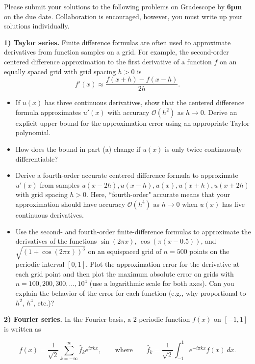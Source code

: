 \documentclass[12pt]{article}
\begin{document}
\noindent
Please submit your solutions to the following problems on Gradescope by \textbf{6pm} on the due date. Collaboration is encouraged, however, you must write up your solutions individually.

\bigskip

\noindent
\textbf{1) Taylor series.} Finite difference formulas are often used to approximate derivatives from function samples on a grid. For example, the second-order centered difference approximation to the first derivative of a function $f$ on an equally spaced grid with grid spacing $h>0$ is
$$
f'(x) \approx \frac{f(x+h)-f(x-h)}{2h}.
$$
\begin{itemize}
    \item[\textbf{(a)}] If $u(x)$ has three continuous derivatives, show that the centered difference formula approximates $u'(x)$ with accuracy $\mathcal{O}(h^2)$ as $h\rightarrow 0$. Derive an explicit upper bound for the approximation error using an appropriate Taylor polynomial. 

	\item[\textbf{(b)}] How does the bound in part (a) change if $u(x)$ is only twice continuously differentiable?
    
    \item[\textbf{(c)}] Derive a fourth-order accurate centered difference formula to approximate $u'(x)$ from samples $u(x-2h), u(x-h), u(x), u(x+h), u(x+2h)$ with grid spacing $h>0$. Here, ``fourth-order" accurate means that your approximation should have accuracy $\mathcal{O}(h^4)$ as $h\rightarrow 0$ when $u(x)$ has five continuous derivatives.

    \item[\textbf{(d)}] Use the second- and fourth-order finite-difference formulas to approximate the derivatives of the functions $\sin(2\pi x)$, $\cos(\pi(x-0.5))$, and $\sqrt{(1+\cos(2\pi x))^3}$ on an equispaced grid of $n=500$ points on the periodic interval $[0,1]$. Plot the approximation error for the derivative at each grid point and then plot the maximum absolute error on grids with $n=100,200,300,\ldots,10^4$ (use a logarithmic scale for both axes). Can you explain the behavior of the error for each function (e.g., why proportional to $h^2$, $h^4$, etc.)?
\end{itemize}

\bigskip

\noindent
\textbf{2) Fourier series.} In the Fourier basis, a $2$-periodic function $f(x)$ on $[-1,1]$ is written as

$$f(x) = \frac{1}{\sqrt{2}}\sum_{k=-\infty}^\infty \hat f_k e^{i\pi kx}, \qquad\text{where}\qquad \hat f_k = \frac{1}{\sqrt{2}}\int_{-1}^1 e^{-i\pi kx}f(x)\,dx.$$
\end{document}
